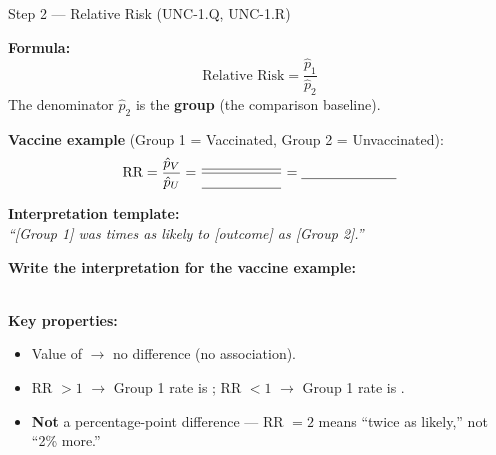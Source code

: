 \documentclass[10pt]{article}
\begin{document}
\begin{notesbox}{Step 2 --- Relative Risk (UNC-1.Q, UNC-1.R)}
\small

\noindent\textbf{Formula:}
\[
  \text{Relative Risk} = \frac{\hat{p}_1}{\hat{p}_2}
\]
The denominator $\hat{p}_2$ is the \textbf{\blank{3cm} group} (the comparison baseline).

\vspace{4pt}
\textbf{Vaccine example} (Group 1 = Vaccinated, Group 2 = Unvaccinated):
\[
  \text{RR} = \frac{\hat{p}_V}{\hat{p}_U} = \frac{\blank{2cm}}{\blank{2cm}} = \blank{2.4cm}
\]

\vspace{6pt}
\textbf{Interpretation template:}\\
\textit{``[Group 1] was \underline{\hspace{2cm}} times as likely to [outcome] as [Group 2].''}

\vspace{6pt}
\textbf{Write the interpretation for the vaccine example:}\\[6pt]
\writeline\\[1pt]\writeline

\vspace{6pt}
\textbf{Key properties:}
\begin{itemize}[leftmargin=1.5em, itemsep=2pt]
  \item Value of \blank{1cm} $\to$ no difference (no association).
  \item RR $> 1$ $\to$ Group 1 rate is \blank{3cm}; RR $< 1$ $\to$ Group 1 rate is \blank{3cm}.
  \item \textbf{Not} a percentage-point difference --- RR $= 2$ means ``twice as likely,'' not ``2\% more.''
\end{itemize}
\end{notesbox}

\vspace{0.1in}
\end{document}
